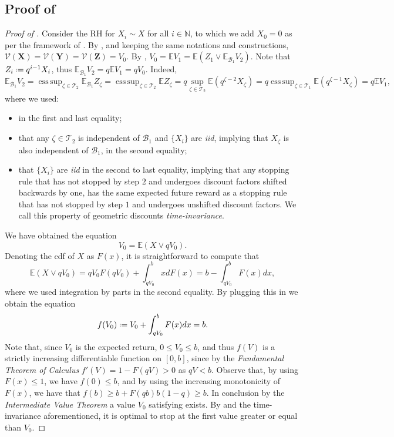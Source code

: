 \documentclass[11pt, a4paper, twoside]{article}
\newcommand*{\defeq}{\mathrel{\vcenter{\baselineskip0.5ex \lineskiplimit0pt
			\hbox{\scriptsize.}\hbox{\scriptsize.}}}=}
\newcommand{\NN}{\mathbb{N}}
\newcommand{\EE}{\mathbb{E}}
\newcommand{\TT}{\mathcal{T}}
\newcommand{\Val}{\mathcal{V}}
\newcommand{\YY}{\mathbf{Y}}
\newcommand{\XX}{\mathbf{X}}
\newcommand{\DZ}{\mathbf{Z}}
\newcommand{\DF}{\mathcal{B}}
\DeclareMathOperator*{\esup}{ess\,sup} \DeclareMathOperator{\supp}{supp}
\numberwithin{equation}{section}
\begin{document}
	\subsection{Proof of }\label{suppGclassgeomprice}
        \begin{proof}[Proof of ]
		Consider the RH for $X_i\sim X$ for all $i\in\NN$, to which we add $X_0=0$ as per the framework of . By , and keeping the same notations and constructions, $\Val(\XX)=\Val(\YY)=\Val(\DZ)=V_0$. By , $V_0=\EE V_1=\EE (Z_1\vee\EE_{\DF_1}V_{2}).$ Note that $Z_i\defeq q^{i-1}X_i$, thus $\EE_{\DF_1}V_{2}=q\EE V_1=qV_0$. Indeed, \[\EE_{\DF_1}V_{2}=\esup_{\zeta\in\TT_{2}}\EE_{\DF_1}Z_\zeta=\esup_{\zeta\in\TT_{2}}\EE Z_\zeta=q\sup_{\zeta\in\TT_{2}}\EE \left(q^{\zeta-2 }X_\zeta\right)=q\esup_{\zeta\in\TT_{1}}\EE \left(q^{\zeta-1 }X_{\zeta}\right)=q\EE V_1,\] where we used:
		\begin{itemize} [noitemsep]
			\item {} in the first and last equality; 
			\item that any $\zeta\in\TT_2$ is independent of $\DF_1$ and $\{X_i\}$ are \textit{iid}, implying that $X_\zeta$ is also independent of $\DF_1$, in the second equality;
			\item that $\{X_i\}$ are \textit{iid} in the second to last equality, implying that any stopping rule that has not stopped by step $2$ and undergoes discount factors shifted backwards by one, has the same expected future reward as a stopping rule that has not stopped by step $1$ and undergoes unshifted discount factors. We call this property of geometric discounts \textit{time-invariance}.
		\end{itemize} 
		We have obtained the equation 
		\begin{equation}\label{geom}
			V_0=\EE (X\vee qV_0).
		\end{equation} 
		Denoting the cdf of $X$ as $F(x)$, it is straightforward to compute that
		\[\EE (X\vee qV_0)=qV_0F(qV_0)+\int_{qV_0}^bxdF(x)=b-\int_{qV_0}^bF(x)dx,\]
		where we used integration by parts in the second equality. By plugging this in  we obtain the equation
		\begin{equation}\label{geom2}
			f(V_0)\defeq V_0+\int_{qV_0}^bF(x)dx=b.
		\end{equation}
		Note that, since $V_0$ is the expected return, $0\le V_0\le b$, and thus $f(V)$ is a strictly increasing differentiable function on $[0,b]$, since by the \textit{Fundamental Theorem of Calculus} $f'(V)=1-F(qV)>0$ as $qV<b$. Observe that, by using $F(x)\le1$, we have $f(0)\le b$, and by using the increasing monotonicity of $F(x)$, we have that $f(b)\ge b+F(qb)b(1-q)\ge b$. In conclusion by the \textit{Intermediate Value Theorem} a value $V_0$ satisfying  exists. By  and the time-invariance aforementioned, it is optimal to stop at the first value greater or equal than $V_0$.
	\end{proof}
	
\end{document}
